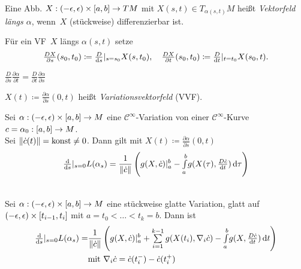 \documentclass{cheat-sheet}
\newcommand{\vinterval}{\ointerval{-\epsilon}{\epsilon}} %
\newcommand{\abinterval}{\cinterval{a}{b}} %
\newcommand{\Cont}{\mathcal{C}} %
\begin{document}
\begin{defn}
  Eine Abb. $X : \vinterval \times \abinterval \to TM$ mit $X(s, t) \in T_{\alpha(s, t)} M$ heißt \emph{Vektorfeld längs $\alpha$}, wenn~$X$ (stückweise) differenzierbar ist.
\end{defn}

\begin{nota}
  Für ein VF~$X$ längs $\alpha(s, t)$ setze
  \[
    \tfrac{D X}{\partial s} (s_0, t_0) \coloneqq \tfrac{D}{\mathrm{d} s} |_{s=s_0} X(s, t_0), \quad
    \tfrac{D X}{\partial t} (s_0, t_0) \coloneqq \tfrac{D}{\mathrm{d} t} |_{t=t_0} X(s_0, t).
  \]
\end{nota}

\begin{lem}
  $\frac{D}{\partial s} \frac{\partial \alpha}{\partial t} = \frac{D}{\partial t} \frac{\partial \alpha}{\partial s}$
\end{lem}

\begin{sprech}
  $X(t) \!\coloneqq\! \tfrac{\partial \alpha}{\partial s} (0, t)$ heißt \emph{Variationsvektorfeld} (VVF).
\end{sprech}

\begin{satz}
  Sei $\alpha : \vinterval \times \abinterval \to M$ eine $\Cont^\infty$-Variation von einer $\Cont^\infty$-Kurve $c = \alpha_0 : \abinterval \to M$. \\
  Sei $\lVert\dot{c}(t)\rVert = \text{konst} \not= 0$.
  Dann gilt mit $X(t) \coloneqq \tfrac{\partial \alpha}{\partial s} (0, t)$
  \[ \tfrac{\mathrm{d}}{\mathrm{d} s} |_{s=0} L(\alpha_s) = \frac{1}{\lVert\dot{c}\rVert} \left( g(X, \dot{c})|_a^b - {\textstyle \int\limits_{a}^{b}} g(X(\tau), \tfrac{D \dot{c}}{\mathrm{d} t}) \,\mathrm{d} \tau \right) \]
\end{satz}


\begin{satz}\mbox{}\\
  Sei $\alpha : \vinterval \times \abinterval \to M$ eine stückweise glatte Variation, glatt auf $\vinterval \times \cinterval{t_{i-1}}{t_i}$ mit $a = t_0 < \ldots < t_k = b$. Dann ist
  \begin{align*}
    \tfrac{\d}{\d s} |_{s=0} L(\alpha_s) = & \frac{1}{\norm{\dot{c}}} \left( g(X, \dot{c})|_a^b + \sum_{i=1}^{k-1} g(X(t_i), \nabla_i \dot{c}) - \Int{a}{b}{g(X, \tfrac{D \dot{c}}{\d t})}{t} \right) \\
    & \text{mit } \nabla_i \dot{c} = \dot{c}(t_i^-) - \dot{c}(t_i^+)
  \end{align*}
\end{satz}
\end{document}
